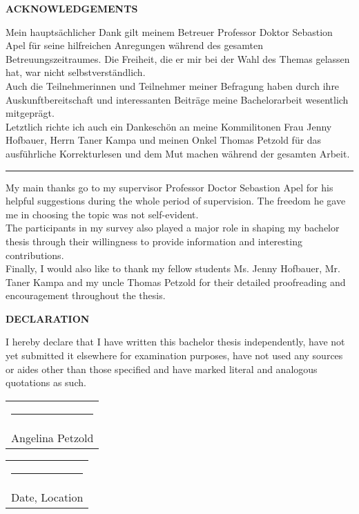 {	\textbf{\centering ACKNOWLEDGEMENTS}
	\vspace*{\fill}

	Mein hauptsächlicher Dank gilt meinem Betreuer Professor Doktor Sebastion Apel für seine hilfreichen Anregungen während des gesamten Betreuungszeitraumes. Die Freiheit, die er mir bei der Wahl des Themas gelassen hat, war nicht selbstverständlich.
	\newline \\
	Auch die Teilnehmerinnen und Teilnehmer meiner Befragung haben durch ihre Auskunftbereitschaft und interessanten Beiträge meine Bachelorarbeit wesentlich mitgeprägt.
	\newline \\
	Letztlich richte ich auch ein Dankeschön an meine Kommilitonen Frau Jenny Hofbauer, Herrn Taner Kampa und meinen Onkel Thomas Petzold für das ausführliche Korrekturlesen und dem Mut machen während der gesamten Arbeit.
	
	\vspace{1cm}
	\noindent\hfil\rule{0.5\textwidth}{.4pt}\hfil
	\vspace{1cm}
	
	My main thanks go to my supervisor Professor Doctor Sebastion Apel for his helpful suggestions during the whole period of supervision. The freedom he gave me in choosing the topic was not self-evident.
	\newline \\
	The participants in my survey also played a major role in shaping my bachelor thesis through their willingness to provide information and interesting contributions.
	\newline \\
	Finally, I would also like to thank my fellow students Ms. Jenny Hofbauer, Mr. Taner Kampa and my uncle Thomas Petzold for their detailed proofreading and encouragement throughout the thesis.
	\vspace*{\fill}
	\pagebreak

	\large
	\leavevmode%
	\vspace*{\fill}
	\begin{center}
		\textbf{DECLARATION}
	\end{center}
			I hereby declare that I have written this bachelor thesis independently, have not yet submitted it elsewhere for examination purposes, have not used any sources or aides other than those specified and have marked literal and analogous quotations as such.
	
	\vspace*{4em}\noindent
	\hfill%
	\begin{tabular}[t]{c}
		\rule{10em}{0.4pt}\\ Angelina Petzold
	\end{tabular}%
	\hfill%
	\begin{tabular}[t]{c}
		\rule{10em}{0.4pt}\\ Date, Location
	\end{tabular}%
	\hfill\strut
	\vspace*{\fill}

	\pagebreak

\par}
